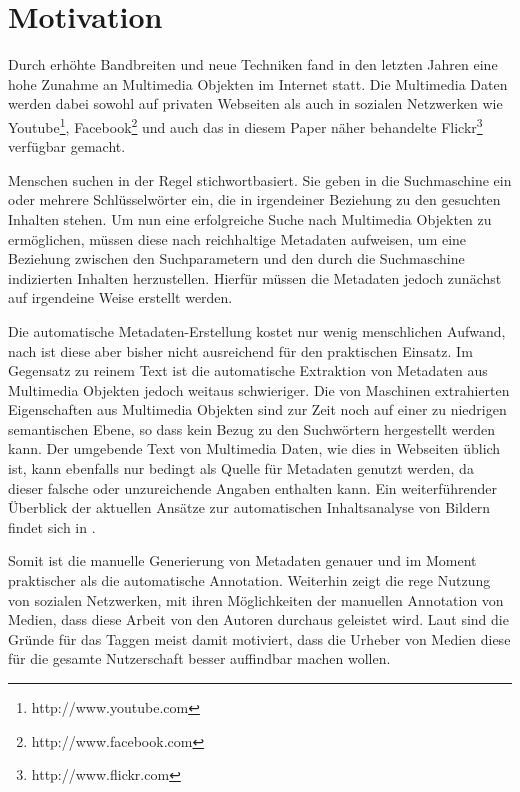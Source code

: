 \section{Motivation}
\label{sub:motivation}
Durch erhöhte Bandbreiten und neue Techniken fand in den letzten Jahren eine hohe Zunahme an Multimedia Objekten im Internet statt. Die Multimedia Daten werden dabei sowohl auf privaten Webseiten als auch in sozialen Netzwerken wie Youtube\footnote{http://www.youtube.com}, Facebook\footnote{http://www.facebook.com} und auch das in diesem Paper näher behandelte Flickr\footnote{http://www.flickr.com} verfügbar gemacht.

Menschen suchen in der Regel stichwortbasiert. Sie geben in die Suchmaschine ein oder mehrere Schlüsselwörter ein, die in irgendeiner Beziehung zu den gesuchten Inhalten stehen. Um nun eine erfolgreiche Suche nach Multimedia Objekten zu ermöglichen, müssen diese nach \cite{collectiveKnowledge} reichhaltige Metadaten aufweisen, um eine Beziehung zwischen den Suchparametern und den durch die Suchmaschine indizierten Inhalten herzustellen. Hierfür müssen die Metadaten jedoch zunächst auf irgendeine Weise erstellt werden.

Die automatische Metadaten-Erstellung kostet nur wenig menschlichen Aufwand, nach \cite{combiningMultipleEvidence} ist diese aber bisher nicht ausreichend für den praktischen Einsatz. Im Gegensatz zu reinem Text ist die automatische Extraktion von Metadaten aus Multimedia Objekten jedoch weitaus schwieriger. Die von Maschinen extrahierten Eigenschaften aus Multimedia Objekten sind zur Zeit noch auf einer zu niedrigen semantischen Ebene, so dass kein Bezug zu den Suchwörtern hergestellt werden kann. Der umgebende Text von Multimedia Daten, wie dies in Webseiten üblich ist, kann ebenfalls nur bedingt als Quelle für Metadaten genutzt werden, da dieser falsche oder unzureichende Angaben enthalten kann. Ein weiterführender Überblick der aktuellen Ansätze zur automatischen Inhaltsanalyse von Bildern findet sich in \cite{datta}.

Somit ist die manuelle Generierung von Metadaten genauer und im Moment praktischer als die automatische Annotation. Weiterhin zeigt die rege Nutzung von sozialen Netzwerken, mit ihren Möglichkeiten der manuellen Annotation von Medien, dass diese Arbeit von den Autoren durchaus geleistet wird. Laut \cite{whyWeTag} sind die Gründe für das Taggen meist damit motiviert, dass die Urheber von Medien diese für die gesamte Nutzerschaft besser auffindbar machen wollen. 

